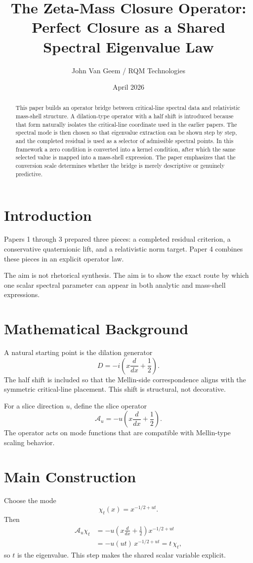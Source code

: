 \documentclass[11pt]{article}
\title{The Zeta-Mass Closure Operator: Perfect Closure as a Shared Spectral Eigenvalue Law}
\author{John Van Geem / RQM Technologies}
\date{April 2026}
\begin{document}
\maketitle

\begin{abstract}
This paper builds an operator bridge between critical-line spectral data and relativistic mass-shell structure. A dilation-type operator with a half shift is introduced because that form naturally isolates the critical-line coordinate used in the earlier papers. The spectral mode is then chosen so that eigenvalue extraction can be shown step by step, and the completed residual is used as a selector of admissible spectral points. In this framework a zero condition is converted into a kernel condition, after which the same selected value is mapped into a mass-shell expression. The paper emphasizes that the conversion scale determines whether the bridge is merely descriptive or genuinely predictive.
\end{abstract}

\section{Introduction}
Papers 1 through 3 prepared three pieces: a completed residual criterion, a conservative quaternionic lift, and a relativistic norm target. Paper 4 combines these pieces in an explicit operator law.

The aim is not rhetorical synthesis. The aim is to show the exact route by which one scalar spectral parameter can appear in both analytic and mass-shell expressions.

\section{Mathematical Background}
A natural starting point is the dilation generator
\[
D=-i\left(x\frac{d}{dx}+\frac12\right).
\]
The half shift is included so that the Mellin-side correspondence aligns with the symmetric critical-line placement. This shift is structural, not decorative.

For a slice direction $u$, define the slice operator
\[
\mathcal A_u=-u\left(x\frac{d}{dx}+\frac12\right).
\]
The operator acts on mode functions that are compatible with Mellin-type scaling behavior.

\section{Main Construction}
Choose the mode
\[
\chi_t(x)=x^{-1/2+ut}.
\]
Then
\[
\begin{aligned}
\mathcal A_u\chi_t
&=-u\left(x\frac{d}{dx}+\frac12\right)x^{-1/2+ut}\\
&=-u(ut)\,x^{-1/2+ut}
=t\,\chi_t,
\end{aligned}
\]
so $t$ is the eigenvalue. This step makes the shared scalar variable explicit.
\end{document}
